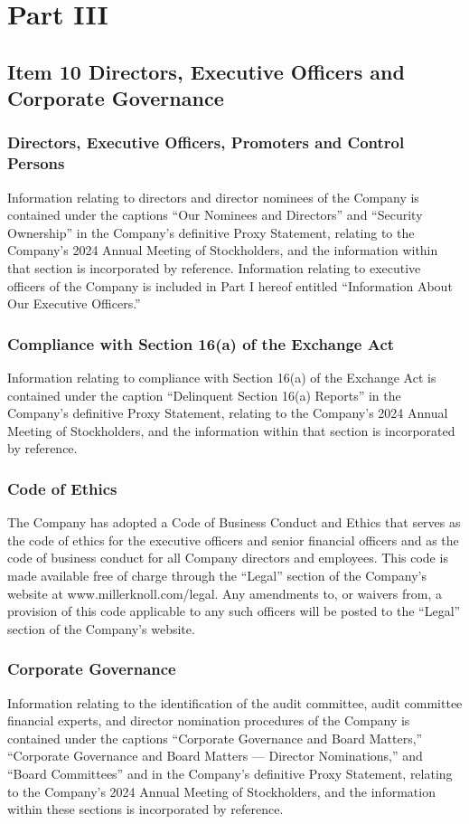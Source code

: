 \section{Part III}

\subsection{Item 10 Directors, Executive Officers and Corporate Governance}

\subsubsection{Directors, Executive Officers, Promoters and Control Persons}
Information relating to directors and director nominees of the Company is contained under the captions “Our Nominees and Directors” and “Security Ownership” in the Company's definitive Proxy Statement, relating to the Company's 2024 Annual Meeting of Stockholders, and the information within that section is incorporated by reference. Information relating to executive officers of the Company is included in Part I hereof entitled “Information About Our Executive Officers.”


\subsubsection{Compliance with Section 16(a) of the Exchange Act}
Information relating to compliance with Section 16(a) of the Exchange Act is contained under the caption “Delinquent Section 16(a) Reports” in the Company's definitive Proxy Statement, relating to the Company's 2024 Annual Meeting of Stockholders, and the information within that section is incorporated by reference.


\subsubsection{Code of Ethics}
The Company has adopted a Code of Business Conduct and Ethics that serves as the code of ethics for the executive officers and senior financial officers and as the code of business conduct for all Company directors and employees. This code is made available free of charge through the “Legal” section of the Company's website at www.millerknoll.com/legal. Any amendments to, or waivers from, a provision of this code applicable to any such officers will be posted to the “Legal” section of the Company's website.


\subsubsection{Corporate Governance}
Information relating to the identification of the audit committee, audit committee financial experts, and director nomination procedures of the Company is contained under the captions “Corporate Governance and Board Matters,” “Corporate Governance and Board Matters — Director Nominations,” and “Board Committees” and in the Company's definitive Proxy Statement, relating to the Company's 2024 Annual Meeting of Stockholders, and the information within these sections is incorporated by reference.


